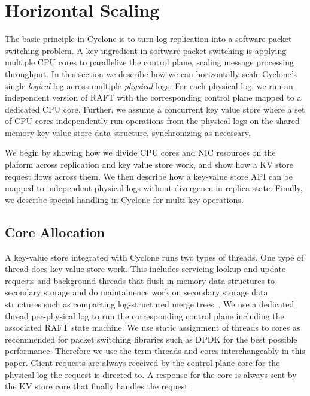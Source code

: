 \documentclass[10pt, preprint, nonatbib]{sigplanconf}
\begin{document}
\section{Horizontal Scaling}
The basic principle in Cyclone is to turn log replication into a software packet
switching problem. A key ingredient in software packet switching is applying
multiple CPU cores to parallelize the control plane, scaling message processing
throughput. In this section we describe how we can horizontally scale Cyclone's
single \emph{logical} log across multiple \emph{physical} logs. For each
physical log, we run an independent version of RAFT with the corresponding
control plane mapped to a dedicated CPU core. Further, we assume a concurrent
key value store where a set of CPU cores independently run operations from the
physical logs on the shared memory key-value store data structure, synchronizing
as necessary.

We begin by showing how we divide CPU cores and NIC resources on the plaform across
replication and key value store work, and show how a KV store request flows
across them.  We then describe how a key-value store API can be mapped to
independent physical logs without divergence in replica state. Finally, we
describe special handling in Cyclone for multi-key operations.

\subsection{Core Allocation}
A key-value store integrated with Cyclone runs two types of threads. One type of
thread does key-value store work. This includes servicing lookup and update
requests and background threads that flush in-memory data structures to
secondary storage and do maintainence work on secondary storage data structures
such as compacting log-structured merge trees~\cite{lsmtree}. We use a dedicated
thread per-physical log to run the corresponding control plane including the
associated RAFT state machine. We use static assignment of threads to cores as
recommended for packet switching libraries such as DPDK for the best possible
performance. Therefore we use the term threads and cores interchangeably in this
paper. Client requests are always received by the control plane core for
the physical log the request is directed to. A response for the core is always
sent by the KV store core that finally handles the request.
\end{document}
